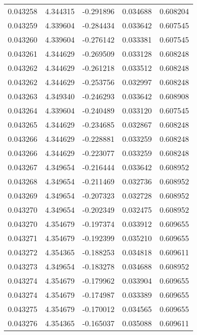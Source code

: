 \begin{tabular}{lrrrr}
0.043258    &  4.344315 & -0.291896 &  0.034688 &             0.608204 \\
0.043259    &  4.339604 & -0.284434 &  0.033642 &             0.607545 \\
0.043260    &  4.339604 & -0.276142 &  0.033381 &             0.607545 \\
0.043261    &  4.344629 & -0.269509 &  0.033128 &             0.608248 \\
0.043262    &  4.344629 & -0.261218 &  0.033512 &             0.608248 \\
0.043262    &  4.344629 & -0.253756 &  0.032997 &             0.608248 \\
0.043263    &  4.349340 & -0.246293 &  0.033642 &             0.608908 \\
0.043264    &  4.339604 & -0.240489 &  0.033120 &             0.607545 \\
0.043265    &  4.344629 & -0.234685 &  0.032867 &             0.608248 \\
0.043266    &  4.344629 & -0.228881 &  0.033259 &             0.608248 \\
0.043266    &  4.344629 & -0.223077 &  0.033259 &             0.608248 \\
0.043267    &  4.349654 & -0.216444 &  0.033642 &             0.608952 \\
0.043268    &  4.349654 & -0.211469 &  0.032736 &             0.608952 \\
0.043269    &  4.349654 & -0.207323 &  0.032728 &             0.608952 \\
0.043270    &  4.349654 & -0.202349 &  0.032475 &             0.608952 \\
0.043270    &  4.354679 & -0.197374 &  0.033912 &             0.609655 \\
0.043271    &  4.354679 & -0.192399 &  0.035210 &             0.609655 \\
0.043272    &  4.354365 & -0.188253 &  0.034818 &             0.609611 \\
0.043273    &  4.349654 & -0.183278 &  0.034688 &             0.608952 \\
0.043274    &  4.354679 & -0.179962 &  0.033904 &             0.609655 \\
0.043274    &  4.354679 & -0.174987 &  0.033389 &             0.609655 \\
0.043275    &  4.354679 & -0.170012 &  0.034565 &             0.609655 \\
0.043276    &  4.354365 & -0.165037 &  0.035088 &             0.609611 \\

\end{tabular}
